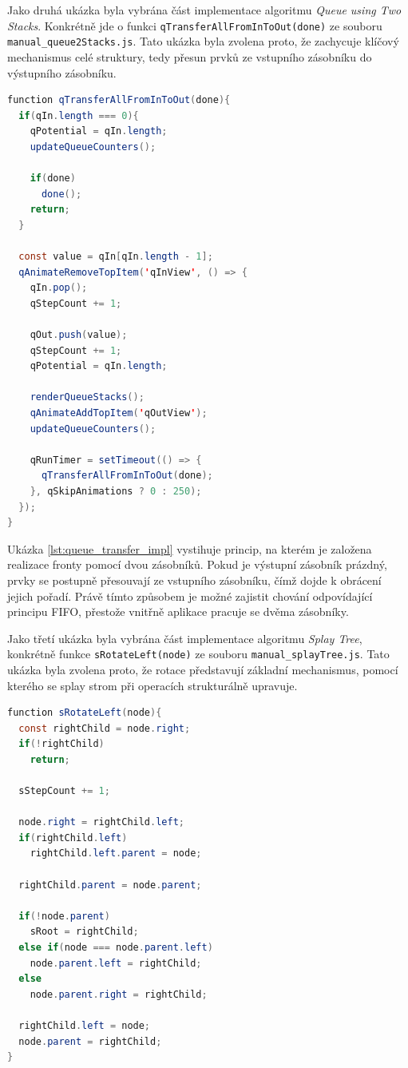 Jako druhá ukázka byla vybrána část implementace algoritmu \textit{Queue using Two Stacks}. Konkrétně jde o funkci \texttt{qTransferAllFromInToOut(done)} ze souboru \texttt{manual\_queue2Stacks.js}. Tato ukázka byla zvolena proto, že zachycuje klíčový mechanismus celé struktury, tedy přesun prvků ze vstupního zásobníku do výstupního zásobníku.

\begin{lstlisting}[language=Java, caption={Zkrácená ukázka přesunu prvků při implementaci fronty pomocí dvou zásobníků}, label={lst:queue_transfer_impl}]
function qTransferAllFromInToOut(done){
  if(qIn.length === 0){
    qPotential = qIn.length;
    updateQueueCounters();
    
    if(done)
      done();
    return;
  }

  const value = qIn[qIn.length - 1];
  qAnimateRemoveTopItem('qInView', () => {
    qIn.pop();
    qStepCount += 1;

    qOut.push(value);
    qStepCount += 1;
    qPotential = qIn.length;
    
    renderQueueStacks();
    qAnimateAddTopItem('qOutView');
    updateQueueCounters();

    qRunTimer = setTimeout(() => {
      qTransferAllFromInToOut(done);
    }, qSkipAnimations ? 0 : 250);
  });
}
\end{lstlisting}

Ukázka \ref{lst:queue_transfer_impl} vystihuje princip, na kterém je založena realizace fronty pomocí dvou zásobníků. Pokud je výstupní zásobník prázdný, prvky se postupně přesouvají ze vstupního zásobníku, čímž dojde k obrácení jejich pořadí. Právě tímto způsobem je možné zajistit chování odpovídající principu FIFO, přestože vnitřně aplikace pracuje se dvěma zásobníky.

Jako třetí ukázka byla vybrána část implementace algoritmu \textit{Splay Tree}, konkrétně funkce \texttt{sRotateLeft(node)} ze souboru \texttt{manual\_splayTree.js}. Tato ukázka byla zvolena proto, že rotace představují základní mechanismus, pomocí kterého se splay strom při operacích strukturálně upravuje.

\begin{lstlisting}[language=Java, caption={Zkrácená ukázka levé rotace ve splay stromu}, label={lst:splay_rotate_left}]
function sRotateLeft(node){
  const rightChild = node.right;
  if(!rightChild)
    return;

  sStepCount += 1;

  node.right = rightChild.left;
  if(rightChild.left)
    rightChild.left.parent = node;

  rightChild.parent = node.parent;

  if(!node.parent)
    sRoot = rightChild;
  else if(node === node.parent.left)
    node.parent.left = rightChild;
  else
    node.parent.right = rightChild;

  rightChild.left = node;
  node.parent = rightChild;
}
\end{lstlisting}

